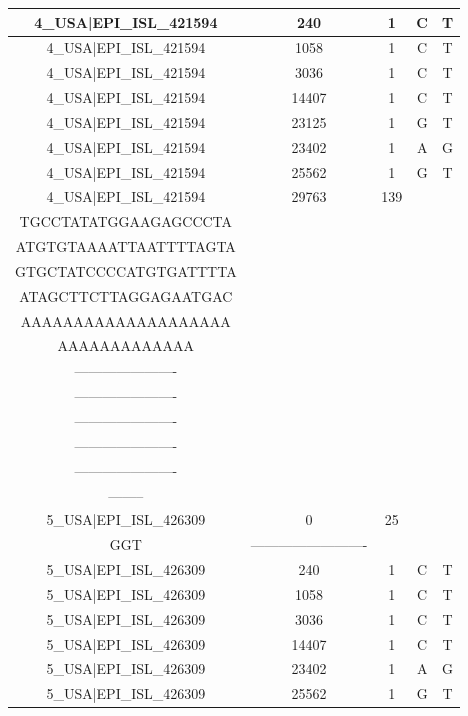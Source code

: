 \documentclass[a4paper,10pt]{article}
\begin{document}
\begin{longtable}{@{}ccccc@{}}
4\_USA|EPI\_ISL\_421594 & 240 & 1 & C & T \\* \midrule
4\_USA|EPI\_ISL\_421594 & 1058 & 1 & C & T \\* \midrule
4\_USA|EPI\_ISL\_421594 & 3036 & 1 & C & T \\* \midrule
4\_USA|EPI\_ISL\_421594 & 14407 & 1 & C & T \\* \midrule
4\_USA|EPI\_ISL\_421594 & 23125 & 1 & G & T \\* \midrule
4\_USA|EPI\_ISL\_421594 & 23402 & 1 & A & G \\* \midrule
4\_USA|EPI\_ISL\_421594 & 25562 & 1 & G & T \\* \midrule
4\_USA|EPI\_ISL\_421594 & 29763 & 139 & \begin{tabular}[c]{@{}c@{}}TGAACAATGCTAGGGAGAGC\\ TGCCTATATGGAAGAGCCCTA\\ ATGTGTAAAATTAATTTTAGTA\\ GTGCTATCCCCATGTGATTTTA\\ ATAGCTTCTTAGGAGAATGAC\\ AAAAAAAAAAAAAAAAAAAA\\ AAAAAAAAAAAAA\end{tabular} & \begin{tabular}[c]{@{}c@{}}---------------------\\ ----------------------\\ ----------------------\\ ----------------------\\ ----------------------\\ ----------------------\\ --------\end{tabular} \\* \midrule
5\_USA|EPI\_ISL\_426309 & 0 & 25 & \begin{tabular}[c]{@{}c@{}}ATTAAAGGTTTATACCTTCCCA\\ GGT\end{tabular} & ------------------------- \\* \midrule
5\_USA|EPI\_ISL\_426309 & 240 & 1 & C & T \\* \midrule
5\_USA|EPI\_ISL\_426309 & 1058 & 1 & C & T \\* \midrule
5\_USA|EPI\_ISL\_426309 & 3036 & 1 & C & T \\* \midrule
5\_USA|EPI\_ISL\_426309 & 14407 & 1 & C & T \\* \midrule
5\_USA|EPI\_ISL\_426309 & 23402 & 1 & A & G \\* \midrule
5\_USA|EPI\_ISL\_426309 & 25562 & 1 & G & T \\* \midrule

\end{longtable}
\end{document}
